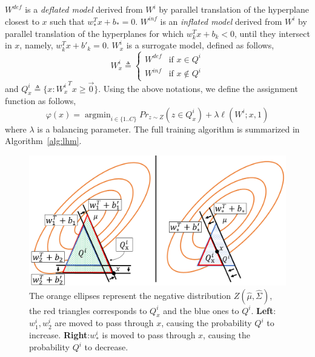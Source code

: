 \documentclass[twoside,11pt]{article}
\newcommand{\argmin}{\mathop{\mathrm{argmin}}}
\begin{document}
$W^{def}$ is a \textit{deflated model} derived from $W^i$ by parallel translation of the hyperplane closest to $x$ such that $w_*^Tx+b_*=0$. $W^{inf}$ is an \textit{inflated model} derived from $W^i$ by parallel translation of the hyperplanes for which $w_k^Tx+b_k<0$, until they intersect in $x$, namely, $w_k^Tx+b'_k=0$.  $W^i_x$ is a surrogate model, defined as follows,
$$W^i_x \triangleq  \begin{cases} W^{def} &\mbox{if } x \in Q^i \\
                      W^{inf} &  \mbox{if } x \notin Q^i
        \end{cases}$$ and $Q^i_x\triangleq \{x:{W^i_x}^Tx \geq \vec{0}\}$.
Using the above notations, we define the assignment function as follows,
\begin{equation}\label{eq:argmin}
\varphi(x)= \argmin_{i\in\{1..C\}}{Pr_{z\sim Z}{(z \in Q^i_x)} +\lambda \ell(W^i;x,1)}
\end{equation}
where $\lambda$ is a balancing parameter.
The full training algorithm is summarized in Algorithm~\ref{alg:lhm}.
\begin{figure}
\center
  \includegraphics[width=0.5\linewidth]{wx_demo.png}
  \caption{The orange ellipses represent the negative distribution $Z(\hat{\mu},\hat{\Sigma})$, the red triangles corresponds to $Q^i_x$ and  the blue ones to $Q^i$. \textbf{Left}: $w^i_1, w^i_2$ are moved to pass through $x$, causing the probability $Q^i$ to increase. \textbf{Right}:$w^i_*$ is moved to pass through $x$, causing the probability $Q^i$ to decrease.}
  \label{fig:wx_demo}
\end{figure}
\end{document}
